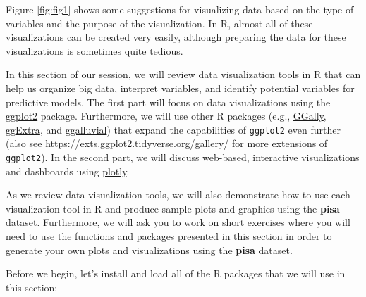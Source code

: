 \documentclass[
]{book}
\begin{document}
Figure \ref{fig:fig1} shows some suggestions for visualizing data based on the type of variables and the purpose of the visualization. In R, almost all of these visualizations can be created very easily, although preparing the data for these visualizations is sometimes quite tedious.

In this section of our session, we will review data visualization tools in R that can help us organize big data, interpret variables, and identify potential variables for predictive models. The first part will focus on data visualizations using the \href{https://ggplot2.tidyverse.org/}{ggplot2} package. Furthermore, we will use other R packages (e.g., \href{http://ggobi.github.io/ggally/\#ggally}{GGally}, \href{https://www.ggplot2-exts.org/ggExtra.html}{ggExtra}, and \href{http://corybrunson.github.io/ggalluvial/}{ggalluvial}) that expand the capabilities of \texttt{ggplot2} even further (also see \url{https://exts.ggplot2.tidyverse.org/gallery/} for more extensions of \texttt{ggplot2}). In the second part, we will discuss web-based, interactive visualizations and dashboards using \href{https://plot.ly/r/}{plotly}.

As we review data visualization tools, we will also demonstrate how to use each visualization tool in R and produce sample plots and graphics using the \textbf{pisa} dataset. Furthermore, we will ask you to work on short exercises where you will need to use the functions and packages presented in this section in order to generate your own plots and visualizations using the \textbf{pisa} dataset.

Before we begin, let's install and load all of the R packages that we will use in this section:
\end{document}
